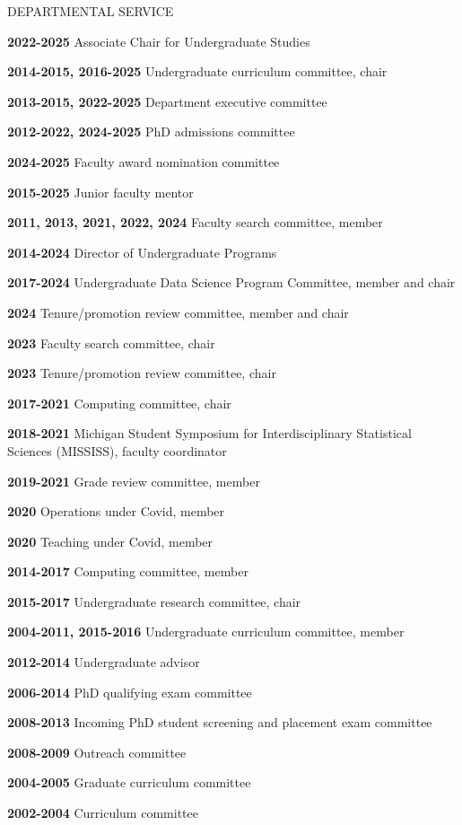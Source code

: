\begin{mylist}{DEPARTMENTAL SERVICE}

\item{\bf 2022-2025 } Associate Chair for Undergraduate Studies
\item{\bf 2014-2015, 2016-2025 } Undergraduate curriculum committee, chair
\item{\bf 2013-2015, 2022-2025 } Department executive committee
\item{\bf 2012-2022, 2024-2025 } PhD admissions committee
\item{\bf 2024-2025 } Faculty award nomination committee
\item{\bf 2015-2025 } Junior faculty mentor
\item{\bf 2011, 2013, 2021, 2022, 2024 } Faculty search committee, member
\item{\bf 2014-2024 } Director of Undergraduate Programs
\item{\bf 2017-2024 } Undergraduate Data Science Program Committee, member and chair
\item{\bf 2024 } Tenure/promotion review committee, member and chair
\item{\bf 2023 } Faculty search committee, chair
\item{\bf 2023 } Tenure/promotion review committee, chair 
\item{\bf 2017-2021 } Computing committee, chair
\item{\bf 2018-2021} Michigan Student Symposium for Interdisciplinary Statistical Sciences (MISSISS), faculty coordinator
\item{\bf 2019-2021 } Grade review committee, member  
\item{\bf 2020 } Operations under Covid, member
\item{\bf 2020 } Teaching under Covid, member
\item{\bf 2014-2017 } Computing committee, member
\item{\bf 2015-2017 } Undergraduate research committee, chair
\item{\bf 2004-2011, 2015-2016 } Undergraduate curriculum committee, member
\item{\bf 2012-2014 } Undergraduate advisor
\item{\bf 2006-2014 } PhD qualifying exam committee
\item{\bf 2008-2013 } Incoming PhD student screening and placement exam committee
\item{\bf 2008-2009 } Outreach committee
\item{\bf 2004-2005 } Graduate curriculum committee
\item{\bf 2002-2004 } Curriculum committee 
\end{mylist}

